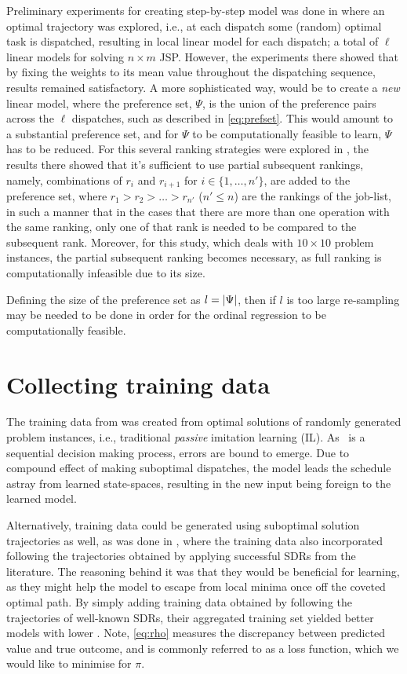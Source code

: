 \documentclass[smallextended]{svjour3}
\begin{document}
Preliminary experiments for creating step-by-step model was done in 
\cite{InRu11a} where an optimal trajectory was explored, i.e., at each dispatch 
some (random) optimal task is dispatched, resulting in local linear model for 
each dispatch; a total of $\ell$ linear models for solving $n\times m$ JSP. 
However, the experiments there showed that by fixing the weights to its mean 
value throughout the dispatching sequence, results remained satisfactory.
A more sophisticated way, would be to create a \emph{new} linear model, where 
the preference set, $\Psi$, is the union of the preference pairs across the 
$\ell$ dispatches, such as described in \cref{eq:prefset}. 
This would amount to a substantial preference set, and for $\Psi$ to be 
computationally feasible to learn, $\Psi$ has to be reduced. For this several 
ranking strategies were explored in \cite{InRu15a}, the results there showed 
that it's sufficient to use partial subsequent rankings, namely, combinations 
of $r_i$ and $r_{i+1}$ for $i\in\{1,\ldots,n'\}$, are added to the preference 
set, where $r_1>r_2>\ldots>r_{n'}$ ($n'\leq n$) are the rankings of the 
job-list, in such a manner that in the cases that there are more than one 
operation with the same ranking, only one of that rank is needed to be compared 
to the subsequent rank. 
Moreover, for this study, which deals with $10\times 10$ problem instances, 
the partial subsequent ranking becomes necessary, as full ranking is 
computationally infeasible due to its size. 

Defining the size of the preference set as $l=\lvert\Psi\rvert$, then if  $l$ is too 
large re-sampling may be needed to be done in order for the ordinal regression 
to be computationally feasible. 

\section{Collecting training data}

The training data from \cite{InRu11a} was created from optimal solutions of 
randomly generated problem instances, i.e., traditional \emph{passive} 
imitation learning (IL). 
As \JSP\ is a sequential decision making process, errors are bound to emerge.  
Due to compound effect of making suboptimal dispatches, the model leads the 
schedule astray from learned state-spaces, resulting in the new input being 
foreign to the learned model. 

Alternatively, training data could be generated using suboptimal solution 
trajectories as well, as was done in \cite{InRu15a}, where the training data 
also incorporated following the trajectories obtained by applying successful 
SDRs from the literature. 
The reasoning behind it was that  they would be beneficial for learning, 
as they might help the model to escape from local minima once off the coveted 
optimal path. 
By simply adding training data obtained by following the trajectories of 
well-known SDRs, their aggregated training set yielded better models with lower 
\namerho. 
Note, \cref{eq:rho} measures the discrepancy between predicted value and true 
outcome, and is commonly referred to as a loss function, which we would like to 
minimise for $\pi$.
\end{document}
